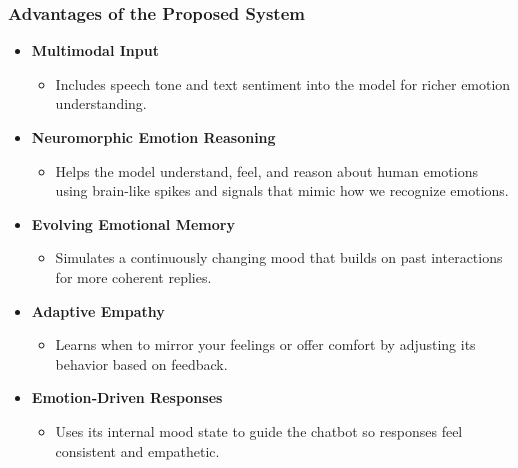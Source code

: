 \documentclass[aspectratio=169]{beamer}
\begin{document}
\begin{frame}
    \frametitle{Advantages of the Proposed System}
    \begin{itemize}
        \item \textbf{Multimodal Input}
        \begin{itemize}
            \item Includes speech tone and text sentiment into the model for richer emotion understanding.
        \end{itemize}
        \item \textbf{Neuromorphic Emotion Reasoning}
        \begin{itemize}
            \item Helps the model understand, feel, and reason about human emotions using brain-like spikes and signals that mimic how we recognize emotions.
        \end{itemize}
        \item \textbf{Evolving Emotional Memory}
        \begin{itemize}
            \item Simulates a continuously changing mood that builds on past interactions for more coherent replies.
        \end{itemize}
        \item \textbf{Adaptive Empathy}
        \begin{itemize}
            \item Learns when to mirror your feelings or offer comfort by adjusting its behavior based on feedback.
        \end{itemize}
        \item \textbf{Emotion‑Driven Responses}
        \begin{itemize}
            \item Uses its internal mood state to guide the chatbot so responses feel consistent and empathetic.
        \end{itemize}
    \end{itemize}
\end{frame}
\end{document}
